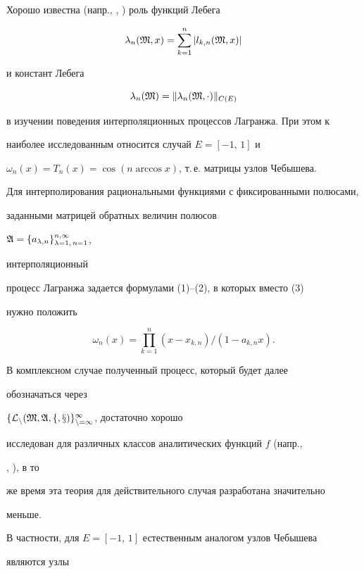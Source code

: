 Хорошо известна (напр., \cite{1}, \cite{2}) роль функций Лебега


$$


\lambda_n(\frak M,x)=\sum^n_{k=1}|l_{k,n}(\frak M,x)|


$$


и констант Лебега


$$


\lambda_n(\frak M)=\|\lambda_n(\frak M,\cdot)\|_{C(E)}


$$


в изучении поведения интерполяционных процессов Лагранжа. При этом к


наиболее исследованным относится случай $E=[-1,\,1]$ и


$\omega_n(x)=T_n(x)=\cos(n\arccos x)$, т.\,е. матрицы узлов Чебышева.





Для интерполирования рациональными функциями с фиксированными полюсами,


заданными матрицей обратных величин полюсов


$\frak A=\{a_{\lambda,n}\}^{n,\infty}_{\lambda=1,\,n=1}$,


интерполяционный


процесс Лагранжа задается формулами (1)--(2), в которых вместо (3)


нужно положить


$$


\omega_n(x)=\prod\limits^n_{k=1}(x-x_{k,n})/(1-a_{k,n}x).


$$





В комплексном случае полученный процесс, который будет далее


обозначаться через\linebreak


$\{\cal L_n(\frak M,\frak A,f,x)\}^\infty_{n=1}$, достаточно хорошо


исследован для различных классов аналитических функций $f$ (напр.,


\cite{3}, \cite{4}), в то


же время эта теория для действительного случая разработана значительно


меньше.





В частности, для $E=[-1,\,1]$ естественным аналогом узлов Чебышева


являются узлы


